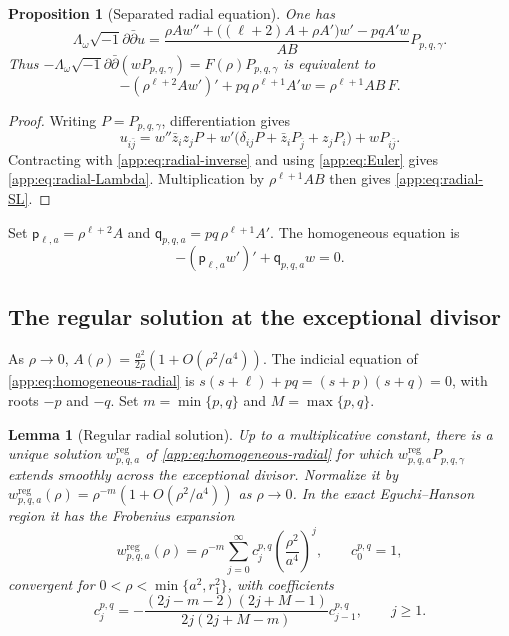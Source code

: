 \documentclass[11pt,a4paper,twoside]{article}
\numberwithin{equation}{section}
\newcommand{\ddc}{\sqrt{-1}\partial\bar\partial}
\newtheorem{proposition}[theorem]{Proposition}
\newtheorem{lemma}[theorem]{Lemma}
\theoremstyle{definition}
\theoremstyle{remark}
\begin{document}
\begin{proposition}[Separated radial equation]
\label{app:prop:radial-equation}
One has
\begin{equation}\label{app:eq:radial-Lambda}
\Lambda_\omega\ddc u
=
\frac{\rho Aw''+\bigl((\ell+2)A+\rho A'\bigr)w'-pqA'w}{AB}
P_{p,q,\gamma}.
\end{equation}
Thus \(-\Lambda_\omega\ddc(wP_{p,q,\gamma})
=F(\rho)P_{p,q,\gamma}\) is equivalent to
\begin{equation}\label{app:eq:radial-SL}
-\left(\rho^{\ell+2}Aw'\right)'
+pq\,\rho^{\ell+1}A'w
=\rho^{\ell+1}AB\,F.
\end{equation}
\end{proposition}

\begin{proof}
Writing \(P=P_{p,q,\gamma}\), differentiation gives
\[
u_{i\bar j}
=w''\bar z_i z_jP
+w'\bigl(\delta_{ij}P+\bar z_iP_{\bar j}+z_jP_i\bigr)
+wP_{i\bar j}.
\]
Contracting with \eqref{app:eq:radial-inverse} and using
\eqref{app:eq:Euler} gives \eqref{app:eq:radial-Lambda}.
Multiplication by \(\rho^{\ell+1}AB\) then gives
\eqref{app:eq:radial-SL}.
\end{proof}

Set \(\mathsf p_{\ell,a}=\rho^{\ell+2}A\) and
\(\mathsf q_{p,q,a}=pq\,\rho^{\ell+1}A'\). The homogeneous equation is
\begin{equation}\label{app:eq:homogeneous-radial}
-(\mathsf p_{\ell,a}w')'+\mathsf q_{p,q,a}w=0.
\end{equation}
\subsection{The regular solution at the exceptional divisor}

As \(\rho\to0\),
\(A(\rho)=\frac{a^2}{2\rho}(1+O(\rho^2/a^4))\).
The indicial equation of \eqref{app:eq:homogeneous-radial} is
\(s(s+\ell)+pq=(s+p)(s+q)=0\), with roots \(-p\) and \(-q\).
Set \(m=\min\{p,q\}\) and \(M=\max\{p,q\}\).

\begin{lemma}[Regular radial solution]
\label{app:lem:regular-Frobenius}
Up to a multiplicative constant, there is a unique solution
\(w_{p,q,a}^{\mathrm{reg}}\) of
\eqref{app:eq:homogeneous-radial} for which
\(w_{p,q,a}^{\mathrm{reg}}P_{p,q,\gamma}\) extends smoothly across
the exceptional divisor. Normalize it by
\(w_{p,q,a}^{\mathrm{reg}}(\rho)
=\rho^{-m}(1+O(\rho^2/a^4))\) as \(\rho\to0\).
In the exact Eguchi--Hanson region it has the Frobenius expansion
\begin{equation}\label{app:eq:Frobenius}
w_{p,q,a}^{\mathrm{reg}}(\rho)
=\rho^{-m}\sum_{j=0}^{\infty}
c_j^{p,q}\left(\frac{\rho^2}{a^4}\right)^j,
\qquad c_0^{p,q}=1,
\end{equation}
convergent for \(0<\rho<\min\{a^2,r_1^2\}\), with coefficients
\begin{equation}\label{app:eq:Frobenius-recursion}
c_j^{p,q}
=-\frac{(2j-m-2)(2j+M-1)}{2j(2j+M-m)}c_{j-1}^{p,q},
\qquad j\ge1.
\end{equation}
\end{lemma}
\end{document}
